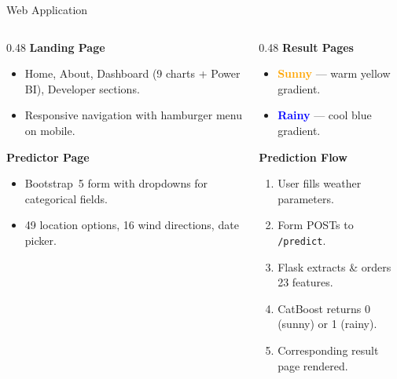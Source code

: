 \documentclass[aspectratio=169]{beamer}
\begin{document}
\begin{frame}{Web Application}
  \small
  \begin{columns}[T]
    \begin{column}{0.48\textwidth}
      \textbf{Landing Page}
      \begin{itemize}\setlength\itemsep{2pt}
        \item Home, About, Dashboard (9 charts + Power BI), Developer sections.
        \item Responsive navigation with hamburger menu on mobile.
      \end{itemize}
      \vspace{0.3em}
      \textbf{Predictor Page}
      \begin{itemize}\setlength\itemsep{2pt}
        \item Bootstrap~5 form with dropdowns for categorical fields.
        \item 49 location options, 16 wind directions, date picker.
      \end{itemize}
    \end{column}
    \begin{column}{0.48\textwidth}
      \textbf{Result Pages}
      \begin{itemize}\setlength\itemsep{2pt}
        \item \textcolor{orange}{\textbf{Sunny}} --- warm yellow gradient.
        \item \textcolor{blue}{\textbf{Rainy}} --- cool blue gradient.
      \end{itemize}
      \vspace{0.3em}
      \textbf{Prediction Flow}
      \begin{enumerate}\setlength\itemsep{2pt}
        \item User fills weather parameters.
        \item Form POSTs to \texttt{/predict}.
        \item Flask extracts \& orders 23 features.
        \item CatBoost returns 0 (sunny) or 1 (rainy).
        \item Corresponding result page rendered.
      \end{enumerate}
    \end{column}
  \end{columns}
\end{frame}
\end{document}
